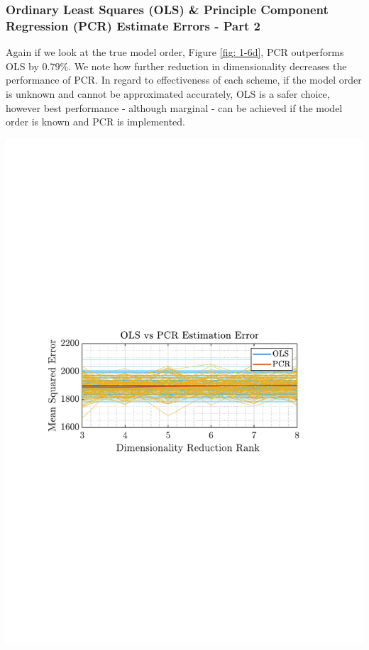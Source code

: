 \documentclass[12pt]{article}
\numberwithin{equation}{section}
\begin{document}
		
	 	\subsubsection{Ordinary Least Squares (OLS) \& Principle Component Regression (PCR)  Estimate Errors - Part 2}
	 	\begin{minipage}{0.49\textwidth}
	 		Again if we look at the true model order, Figure \ref{fig: 1-6d}, PCR outperforms OLS by $0.79\%$. We note how further reduction in dimensionality decreases the performance of PCR. In regard to effectiveness of each scheme, if the model order is unknown and cannot be approximated accurately, OLS is a safer choice, however best performance - although marginal - can be achieved if the model order is known and PCR is implemented.
	 	\end{minipage}%
		 \begin{minipage}{0.04\textwidth}
		 	  \hspace*{0.04\textwidth}
		 \end{minipage}%
	 	\begin{minipage}{0.49\textwidth}
			\centering
	 		\includegraphics[trim={2.2cm 11.2cm 3.15cm  11.2cm}, clip, width=\textwidth]{../MATLAB/figures/q1_6d_fig01.pdf} 
	 		\captionsetup{justification=centering}
	 		\label{fig: 1-6d}
	 	\end{minipage}%
 
\end{document}
